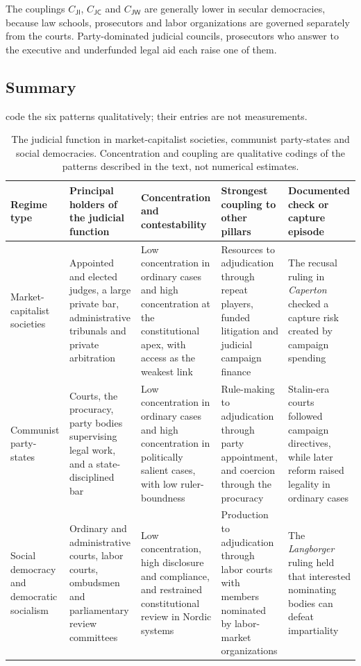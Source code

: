 \documentclass[11pt,letterpaper]{article}
\theoremstyle{definition}
\theoremstyle{remark}
\newcommand{\pJ}{\mathsf{J}}
\newcommand{\pI}{\mathsf{I}}
\newcommand{\pC}{\mathsf{C}}
\newcommand{\pW}{\mathsf{W}}
\begin{document}
The couplings $C_{\pJ\pI}$, $C_{\pJ\pC}$ and $C_{\pJ\pW}$ are generally lower in secular democracies, because law schools, prosecutors and labor organizations are governed separately from the courts. Party-dominated judicial councils, prosecutors who answer to the executive and underfunded legal aid each raise one of them.

\subsection{Summary}

 code the six patterns qualitatively; their entries are not measurements.

\begin{table}[!htb]
\centering
\small
\caption{The judicial function in market-capitalist societies, communist party-states and social democracies. Concentration and coupling are qualitative codings of the patterns described in the text, not numerical estimates.}
\label{tab:regimes}
\begin{tabularx}{\textwidth}{L{2.2cm}YYYY}
\toprule
Regime type & Principal holders of the judicial function & Concentration and contestability & Strongest coupling to other pillars & Documented check or capture episode \\
\midrule
Market-capitalist societies & Appointed and elected judges, a large private bar, administrative tribunals and private arbitration & Low concentration in ordinary cases and high concentration at the constitutional apex, with access as the weakest link & Resources to adjudication through repeat players, funded litigation and judicial campaign finance & The recusal ruling in \emph{Caperton} checked a capture risk created by campaign spending \\
\addlinespace
Communist party-states & Courts, the procuracy, party bodies supervising legal work, and a state-disciplined bar & Low concentration in ordinary cases and high concentration in politically salient cases, with low ruler-boundness & Rule-making to adjudication through party appointment, and coercion through the procuracy & Stalin-era courts followed campaign directives, while later reform raised legality in ordinary cases \\
\addlinespace
Social democracy and democratic socialism & Ordinary and administrative courts, labor courts, ombudsmen and parliamentary review committees & Low concentration, high disclosure and compliance, and restrained constitutional review in Nordic systems & Production to adjudication through labor courts with members nominated by labor-market organizations & The \emph{Langborger} ruling held that interested nominating bodies can defeat impartiality \\
\bottomrule
\end{tabularx}
\end{table}
\end{document}
